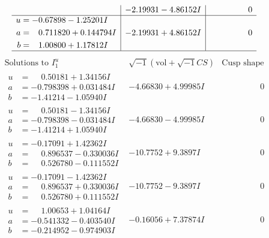 \documentclass[1p]{elsarticle_modified}
\theoremstyle{definition}
\newcommand{\I}{\sqrt{-1}}
\begin{document}
$$\begin{array}{c|c|c}
 & -2.19931 - 4.86152 I & \phantom{-0.000000 } 0 \\ \hline\begin{aligned}
u &= -0.67898 - 1.25201 I \\
a &= \phantom{-}0.711820 + 0.144794 I \\
b &= \phantom{-}1.00800 + 1.17812 I\end{aligned}
 & -2.19931 + 4.86152 I & \phantom{-0.000000 } 0\\
 \hline 
 \end{array}$$\newpage$$\begin{array}{c|c|c}  
\text{Solutions to }I^u_{1}& \I (\text{vol} + \sqrt{-1}CS) & \text{Cusp shape}\\
 \hline 
\begin{aligned}
u &= \phantom{-}0.50181 + 1.34156 I \\
a &= -0.798398 + 0.031484 I \\
b &= -1.41214 - 1.05940 I\end{aligned}
 & -4.66830 + 4.99985 I & \phantom{-0.000000 } 0 \\ \hline\begin{aligned}
u &= \phantom{-}0.50181 - 1.34156 I \\
a &= -0.798398 - 0.031484 I \\
b &= -1.41214 + 1.05940 I\end{aligned}
 & -4.66830 - 4.99985 I & \phantom{-0.000000 } 0 \\ \hline\begin{aligned}
u &= -0.17091 + 1.42362 I \\
a &= \phantom{-}0.896537 - 0.330036 I \\
b &= \phantom{-}0.526780 - 0.111552 I\end{aligned}
 & -10.7752 + 9.3897 I & \phantom{-0.000000 } 0 \\ \hline\begin{aligned}
u &= -0.17091 - 1.42362 I \\
a &= \phantom{-}0.896537 + 0.330036 I \\
b &= \phantom{-}0.526780 + 0.111552 I\end{aligned}
 & -10.7752 - 9.3897 I & \phantom{-0.000000 } 0 \\ \hline\begin{aligned}
u &= \phantom{-}1.00653 + 1.04164 I \\
a &= -0.541332 - 0.403540 I \\
b &= -0.214952 - 0.974903 I\end{aligned}
 & -0.16056 + 7.37874 I & \phantom{-0.000000 } 0 \\ \hline\begin{aligned}

\end{aligned}
\end{array}$$
\end{document}
